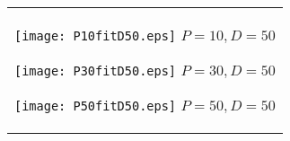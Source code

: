 \documentclass[a4paper,11pt,oneside,openany]{jsbook}
\begin{document}
\begin{figure}[htbp]
  \begin{center}
    \begin{tabular}{c}


      \begin{minipage}{0.33\hsize}
        \begin{center}
          \texttt{[image: P10fitD50.eps]}
          \hspace{1.2cm} $P=10, D=50
$        \end{center}
      \end{minipage}

      \begin{minipage}{0.33\hsize}
        \begin{center}
          \texttt{[image: P30fitD50.eps]}
          \hspace{1.2cm} $P=30, D=50
$        \end{center}
      \end{minipage}

      \begin{minipage}{0.33\hsize}
        \begin{center}
          \texttt{[image: P50fitD50.eps]}
          \hspace{1.2cm} $P=50, D=50
$        \end{center}
      \end{minipage}
    \end{tabular}
  \end{center}
\end{figure}
\end{document}
